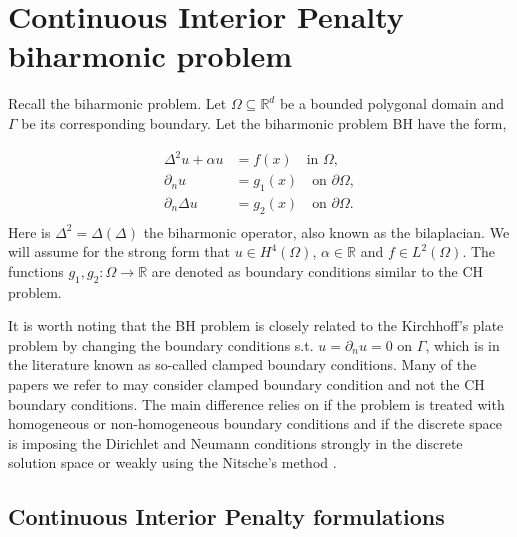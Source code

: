 
\newpage
\section{Continuous Interior Penalty biharmonic problem }%
\label{sec:CIP_biharmonic_problem}

Recall the biharmonic problem.
Let $\Omega \subseteq    \mathbb{R} ^d$ be a bounded polygonal domain and $\Gamma $ be its corresponding boundary. Let the biharmonic problem BH have the form,

\begin{equation}
\label{eq:bi_problem}
\begin{split}
    \Delta^2  u  + \alpha  u  & = f( x)  \quad \text{in } \Omega,   \\
    \partial _{n} u & = g_{1}(x)   \quad \text{on } \partial \Omega,  \\
    \partial _{n} \Delta  u & = g_{2}( x)   \quad \text{on } \partial \Omega .  \\
\end{split}
\end{equation}
Here is $\Delta ^2 = \Delta  \left( \Delta  \right) $ the biharmonic operator, also known as the bilaplacian. We will assume for the strong form that $u \in H^{4}\left( \Omega  \right) $, $\alpha  \in  \mathbb{R} $ and $f \in L^{2}\left( \Omega  \right)
$. The functions $g_{1},g_{2}: \Omega  \to \mathbb{R}$ are denoted as boundary conditions similar to the CH problem.

\begin{remark}
It is worth noting that the BH problem is closely related to the Kirchhoff's plate problem by changing the boundary conditions s.t. $u = \partial _{n } u = 0$ on $\Gamma $, which is in the literature known as so-called clamped boundary conditions.
Many of the papers we refer to may consider clamped boundary condition and not the CH boundary conditions. The main difference relies on if the problem is treated with homogeneous or non-homogeneous boundary conditions and if the discrete space is
imposing the Dirichlet and Neumann conditions strongly in the discrete solution space or weakly using the Nitsche's method \cite{nitsche1971variationsprinzip}.
\end{remark}


\subsection{Continuous Interior Penalty formulations}%
\label{sub:continuous_interior_penalty_formulations}

